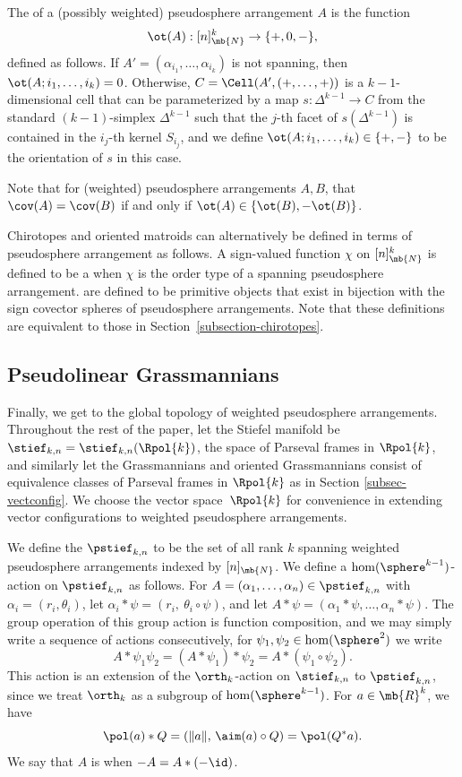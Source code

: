 The  of a (possibly weighted) pseudosphere arrangement $A$ is the function
\[ \ot (A) : [n]_\mb{N}^k \to \{+,0,-\}, \]
defined as follows.
If $A' = (\alpha_{i_1},\dots,\alpha_{i_k})$ is not spanning, then $\ot(A;i_1,\dots,i_k) = 0$.
Otherwise, $C = \Cell(A',(+,\dots,+))$ is a $k{-}1$-dimensional cell that can be parameterized by a map $s : \Delta^{k-1} \to C$ from the standard $(k{-}1)$-simplex $\Delta^{k-1}$ such that the $j$-th facet of $s(\Delta^{k-1})$ is contained in the $i_j$-th kernel $S_{{i_j}}$,
and we define $\ot(A;i_1,\dots,i_k) \in \{+,-\}$ to be the orientation of $s$ in this case.

Note that for (weighted) pseudosphere arrangements $A,B$, that $\cov(A) = \cov(B)$ if and only if $\ot(A) \in \{\ot(B),-\ot(B)\}$.

Chirotopes and oriented matroids can alternatively be defined in terms of pseudosphere arrangement as follows.
A sign-valued function $\chi$ on $[n]_\mb{N}^k$ is defined to be a  when $\chi$ is the order type of a spanning pseudosphere arrangement.
 are defined to be primitive objects that exist in bijection with the sign covector spheres of pseudosphere arrangements.
Note that these definitions are equivalent to those in Section~\ref{subsection-chirotopes}.

\subsection{Pseudolinear Grassmannians}\label{subsection-psg-def}

Finally, we get to the global topology of weighted pseudosphere arrangements.
Throughout the rest of the paper, let the Stiefel manifold be $\stief_{k,n} = \stief_{k,n}(\Rpol{k})$, \ie the space of Parseval frames in $\Rpol{k}$, and similarly let the Grassmannians and oriented Grassmannians consist of equivalence classes of Parseval frames in $\Rpol{k}$ as in Section \ref{subsec-vectconfig}. We choose the vector space~$\Rpol{k}$ for convenience in extending vector configurations to weighted pseudosphere arrangements.

We define the  $\pstief_{k,n}$ to be the set of all rank $k$ spanning weighted pseudosphere arrangements indexed by $[n]_\mb{N}$.
We define a $\hom(\sphere^{k-1})$-action on $\pstief_{k,n}$ as follows.
For $A = (\alpha_1,\dots,\alpha_n) \in \pstief_{k,n}$ with $\alpha_i = (r_i,\theta_i)$, let
$\alpha_i * \psi = (r_i,\ \theta_i \circ \psi)$, and let
$A*\psi = (\alpha_1*\psi,\dots,\alpha_n*\psi)$. The group operation of this group action is function composition, and we may simply write a sequence of actions consecutively, \ie for $\psi_1,\psi_2 \in \hom(\sphere^2)$ we write
\[ A*\psi_1\psi_2 = (A*\psi_1)*\psi_2 = A*(\psi_1\circ\psi_2). \]
This action is an extension of the $\orth_k$-action on $\stief_{k,n}$ to $\pstief_{k,n}$, since we treat $\orth_k$ as a subgroup of $\hom(\sphere^{k-1})$. For $a \in \mb{R}^k$, we have
\[ \pol(a)*Q = (\|a\|,\, \aim (a) \circ Q) = \pol(Q^* a).\]
We say that $A$ is  when $-A = A*(-\id)$.


